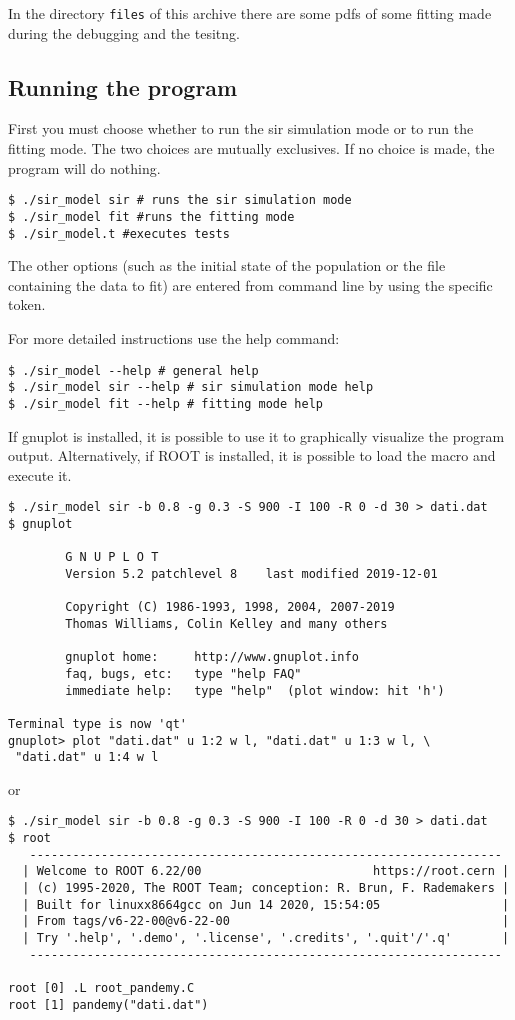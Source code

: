 In the directory \verb!files! of this archive there are some pdfs  of some fitting made during the debugging and the tesitng.

\subsection{Running the program}

First you must choose whether to run the sir simulation mode or to run the fitting mode. The two choices are mutually exclusives. If no choice is made, the program will do nothing.
\begin{verbatim}
$ ./sir_model sir # runs the sir simulation mode
$ ./sir_model fit #runs the fitting mode
$ ./sir_model.t #executes tests
\end{verbatim}
The other options (such as the initial state of the population or the file containing the data to fit) are entered from command line by using the specific token.

For more detailed instructions use the help command:
\begin{verbatim}
$ ./sir_model --help # general help
$ ./sir_model sir --help # sir simulation mode help
$ ./sir_model fit --help # fitting mode help
\end{verbatim}

If gnuplot is installed, it is possible to use it to graphically visualize the program output. Alternatively, if ROOT is installed, it is possible to load the macro and execute it.
\begin{verbatim}
$ ./sir_model sir -b 0.8 -g 0.3 -S 900 -I 100 -R 0 -d 30 > dati.dat
$ gnuplot

        G N U P L O T
        Version 5.2 patchlevel 8    last modified 2019-12-01

        Copyright (C) 1986-1993, 1998, 2004, 2007-2019
        Thomas Williams, Colin Kelley and many others

        gnuplot home:     http://www.gnuplot.info
        faq, bugs, etc:   type "help FAQ"
        immediate help:   type "help"  (plot window: hit 'h')

Terminal type is now 'qt'
gnuplot> plot "dati.dat" u 1:2 w l, "dati.dat" u 1:3 w l, \
 "dati.dat" u 1:4 w l
\end{verbatim} or 
\begin{verbatim}
$ ./sir_model sir -b 0.8 -g 0.3 -S 900 -I 100 -R 0 -d 30 > dati.dat
$ root
   ------------------------------------------------------------------
  | Welcome to ROOT 6.22/00                        https://root.cern |
  | (c) 1995-2020, The ROOT Team; conception: R. Brun, F. Rademakers |
  | Built for linuxx8664gcc on Jun 14 2020, 15:54:05                 |
  | From tags/v6-22-00@v6-22-00                                      |
  | Try '.help', '.demo', '.license', '.credits', '.quit'/'.q'       |
   ------------------------------------------------------------------

root [0] .L root_pandemy.C
root [1] pandemy("dati.dat")
\end{verbatim}

